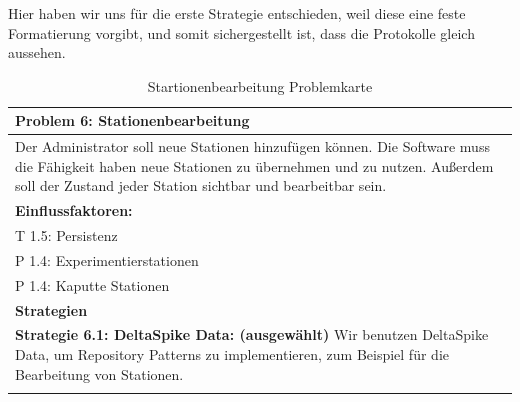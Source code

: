 \documentclass[enabledeprecatedfontcommands,fontsize=12pt,paper=a4,twoside]{scrartcl}
\begin{document}



Hier haben wir uns  für die erste Strategie entschieden, weil diese eine feste Formatierung vorgibt, und somit sichergestellt ist, dass die Protokolle gleich aussehen.\\


\begin{table}[]

    \centering
    \begin{tabular}{|p{15cm}|}
    \hline
          \textbf{Problem 6:} Stationenbearbeitung 
          \\ \hline
          Der Administrator soll neue Stationen hinzufügen können. Die Software muss die Fähigkeit haben neue Stationen zu übernehmen und zu nutzen. Außerdem soll der Zustand jeder Station sichtbar und bearbeitbar sein.
          \\ \hline
          \textbf{Einflussfaktoren: } \\
          T 1.5: Persistenz \\
          P 1.4: Experimentierstationen\\
          P 1.4: Kaputte Stationen\\
          \hline
          \textbf{Strategien} \\ \hline
          \textbf{Strategie 6.1: DeltaSpike Data: (ausgewählt)} Wir benutzen DeltaSpike Data, um Repository Patterns zu implementieren, zum Beispiel für die Bearbeitung von Stationen. \\
          \\ \hline
    \end{tabular}
    \caption{ Startionenbearbeitung Problemkarte}
    \label{tab:ProblemKarte6}
\end{table}
\end{document}
